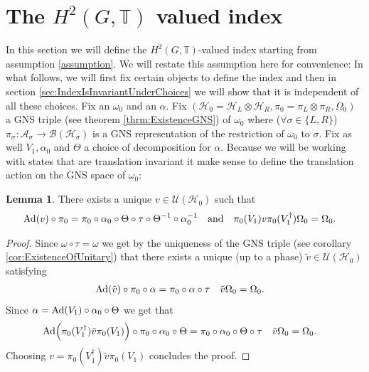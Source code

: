 \documentclass[12pt,a4paper,twoside]{article}
\let\originalleft\left
\let\originalright\right
\renewcommand{\left}{\mathopen{}\mathclose\bgroup\originalleft}
\renewcommand{\right}{\aftergroup\egroup\originalright}
\newcommand{\UU}{\mathcal U}
\newcommand{\BB}{\mathcal B}
\newcommand{\HH}{\mathcal H}
\newcommand{\TT}{\mathbb T}
\renewcommand{\AA}{\mathcal A}
\newcommand{\Ad}[1]{\textrm{Ad}\left(#1\right)}
\theoremstyle{definition}
\newtheorem{lemma}[theorem]{Lemma}
\numberwithin{equation}{section}
\begin{document}
\section{The $H^2(G,\TT)$ valued index}\label{sec:ProofFirstStatement}
In this section we will define the $H^2(G,\TT)$-valued index starting from assumption \ref{assumption}. We will restate this assumption here for convenience:
\assumptionOne*
In what follows, we will first fix certain objects to define the index and then in section \ref{sec:IndexIsInvariantUnderChoices} we will show that it is independent of all these choices. Fix an $\omega_0$ and an $\alpha$. Fix $(\HH_0=\HH_L\otimes\HH_R,\pi_0=\pi_L\otimes\pi_R,\Omega_0)$ a GNS triple (see theorem \ref{thrm:ExistenceGNS}) of $\omega_0$ where ($\forall\sigma\in\{L,R\}$) $\pi_\sigma:\AA_\sigma\rightarrow\BB(\HH_\sigma)$ is a GNS representation of the restriction of $\omega_0$ to $\sigma$. Fix as well $V_1,\alpha_0$ and $\Theta$ a choice of decomposition for $\alpha$. Because we will be working with states that are translation invariant it make sense to define the translation action on the GNS space of $\omega_0$:
\begin{lemma}\label{lem:Definition_v}
	There exists a unique $v\in\UU(\HH_0)$ such that
	\begin{align}
		\Ad{v}\circ\pi_0&=\pi_0\circ\alpha_0\circ\Theta\circ\tau\circ\Theta^{-1}\circ\alpha_0^{-1}&&\text{and}&\pi_0(V_1)v\pi_0(V_1^\dagger)\Omega_0&=\Omega_0.
	\end{align}
\end{lemma}
\begin{proof}
	Since $\omega\circ\tau=\omega$ we get by the uniqueness of the GNS triple (see corollary \ref{cor:ExistenceOfUnitary}) that there exists a unique (up to a phase) $\tilde{v}\in\UU(\HH_0)$ satisfying
	\begin{align}
		\Ad{\tilde{v}}\circ\pi_0\circ\alpha&=\pi_0\circ\alpha\circ\tau&\tilde{v}\Omega_0&=\Omega_0.
	\end{align}
	Since $\alpha=\Ad{V_1}\circ\alpha_0\circ\Theta$ we get that
	\begin{align}
		\Ad{\pi_0(V_1^\dagger)\tilde{v}\pi_0(V_1)}\circ\pi_0\circ\alpha_0\circ\Theta&=\pi_0\circ\alpha_0\circ\Theta\circ\tau&\tilde{v}\Omega_0&=\Omega_0.
	\end{align}
	Choosing $v=\pi_0(V_1^\dagger)\tilde{v}\pi_0(V_1)$  concludes the proof.
\end{proof}
\end{document}
